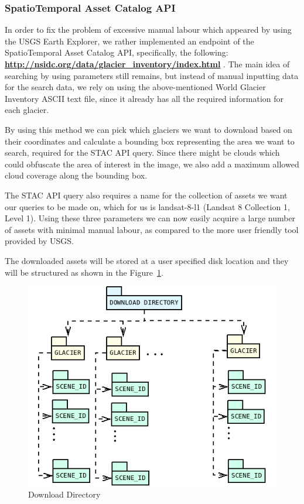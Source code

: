 \documentclass[12pt, a4paper]{report}
\begin{document}
	\subsubsection{SpatioTemporal Asset Catalog API}
	\label{seq:STAC}
	
	\par In order to fix the problem of excessive manual labour which appeared by using the USGS Earth Explorer, we rather implemented an endpoint of the SpatioTemporal Asset Catalog API, specifically, the following: \textbf{\url{http://nsidc.org/data/glacier_inventory/index.html}} \cite{STAC}. The main idea of searching by using parameters still remains, but instead of manual inputting data for the search data, we rely on using the above-mentioned World Glacier Inventory ASCII text file, since it already has all the required information for each glacier.
	
	\par By using this method we can pick which glaciers we want to download based on their coordinates and calculate a bounding box representing the area we want to search, required for the STAC API query. Since there might be clouds which could obfuscate the area of interest in the image, we also add a maximum allowed cloud coverage along the bounding box.
	
	\par The STAC API query also requires a name for the collection of assets we want our queries to be made on, which for us is landsat-8-l1 (Landsat 8 Collection 1, Level 1). Using these three parameters we can now easily acquire a large number of assets with minimal manual labour, as compared to the more user friendly tool provided by USGS.
	
	\par The downloaded assets will be stored at a user specified disk location and they will be structured as shown in the Figure~\ref{fig:DownloadDirectory}.
	\begin{figure}[h]
		\centering
		\includegraphics[scale=0.4]{../images/DownloadDirectory.png}
		\caption{Download Directory}
		\label{fig:DownloadDirectory}
	\end{figure}
	
\end{document}
